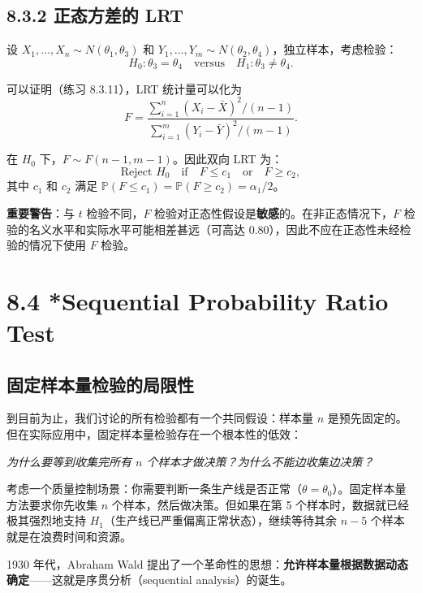\subsection{8.3.2 正态方差的 LRT}\label{sec:8.3.2}

\begin{example}[两方差相等的 F 检验]\label{ex:f-test-variance}
设 $X_1, \ldots, X_n \sim N(\theta_1, \theta_3)$ 和 $Y_1, \ldots, Y_m \sim N(\theta_2, \theta_4)$，独立样本，考虑检验：
\[
H_0: \theta_3 = \theta_4 \quad \text{versus} \quad H_1: \theta_3 \neq \theta_4.
\]

可以证明（练习 8.3.11），LRT 统计量可以化为
\[
F = \frac{\sum_{i=1}^n (X_i - \bar{X})^2 / (n-1)}{\sum_{i=1}^m (Y_i - \bar{Y})^2 / (m-1)}. \label{eq:f-statistic-variance}
\]

在 $H_0$ 下，$F \sim F(n-1, m-1)$。因此双向 LRT 为：
\[
\text{Reject } H_0 \quad \text{if} \quad F \leq c_1 \quad \text{or} \quad F \geq c_2,
\]
其中 $c_1$ 和 $c_2$ 满足 $\mathbb{P}(F \leq c_1) = \mathbb{P}(F \geq c_2) = \alpha_1/2$。

\textbf{重要警告}：与 $t$ 检验不同，$F$ 检验对正态性假设是\textbf{敏感}的。在非正态情况下，$F$ 检验的名义水平和实际水平可能相差甚远（可高达 $0.80$），因此不应在正态性未经检验的情况下使用 $F$ 检验。\end{example}

\section{8.4 *Sequential Probability Ratio Test}\label{sec:8.4}

\subsection{固定样本量检验的局限性}

到目前为止，我们讨论的所有检验都有一个共同假设：样本量 $n$ 是预先固定的。但在实际应用中，固定样本量检验存在一个根本性的低效：

\begin{center}
\textit{为什么要等到收集完所有 $n$ 个样本才做决策？为什么不能边收集边决策？}
\end{center}

考虑一个质量控制场景：你需要判断一条生产线是否正常（$\theta = \theta_0$）。固定样本量方法要求你先收集 $n$ 个样本，然后做决策。但如果在第 5 个样本时，数据就已经极其强烈地支持 $H_1$（生产线已严重偏离正常状态），继续等待其余 $n-5$ 个样本就是在浪费时间和资源。

1930 年代，Abraham Wald 提出了一个革命性的思想：\textbf{允许样本量根据数据动态确定}——这就是序贯分析（sequential analysis）的诞生。

